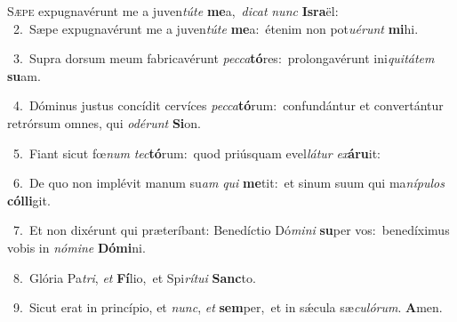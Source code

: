 \lettrine{\initial\textcolor{\initialcolor}{S}}{æpe} expugnavérunt me a juven\-\textit{tú}\-\textit{te} \textbf{me}\-a,~\star \textit{di}\-\textit{cat} \textit{nunc} \textbf{Is}\-\textbf{ra}ël:\\
{\numbfont\textcolor{\numbcolor}{~2.}}~Sæpe expugnavérunt me a juven\-\textit{tú}\-\textit{te} \textbf{me}\-a:~\star étenim non pot\-\textit{u}\-\textit{é}\textit{runt} \textbf{mi}\-hi.\par
{\numbfont\textcolor{\numbcolor}{~3.}}~Supra dorsum meum fabricavérunt \textit{pec}\-\textit{ca}\textbf{tó}res:~\star prolongavérunt ini\-\textit{qui}\-\textit{tá}\textit{tem} \textbf{su}\-am.\par
{\numbfont\textcolor{\numbcolor}{~4.}}~Dóminus justus concídit cervíces \textit{pec}\-\textit{ca}\textbf{tó}rum:~\star confundántur et convertántur retrórsum omnes, qui \textit{o}\-\textit{dé}\textit{runt} \textbf{Si}\-on.\par
{\numbfont\textcolor{\numbcolor}{~5.}}~Fiant sicut fœ\textit{num} \textit{tec}\-\textbf{tó}rum:~\star quod priúsquam evel\-\textit{lá}\-\textit{tur} \textit{ex}\-\textbf{á}\textbf{ru}it:\par
{\numbfont\textcolor{\numbcolor}{~6.}}~De quo non implévit manum su\textit{am} \textit{qui} \textbf{me}\-tit:~\star et sinum suum qui ma\-\textit{ní}\-\textit{pu}\textit{los} \textbf{cól}\-\textbf{li}git.\par
{\numbfont\textcolor{\numbcolor}{~7.}}~Et non dixérunt qui præteríbant: Benedíctio Dó\-\textit{mi}\-\textit{ni} \textbf{su}\-per vos:~\star benedíximus vobis in \textit{nó}\-\textit{mi}\textit{ne} \textbf{Dó}\-\textbf{mi}ni.\par
{\numbfont\textcolor{\numbcolor}{~8.}}~Glória Pa\-\textit{tri}\-, \textit{et} \textbf{Fí}\-lio,~\star et Spi\-\textit{rí}\-\textit{tu}\textit{i} \textbf{Sanc}\-to.\par
{\numbfont\textcolor{\numbcolor}{~9.}}~Sicut erat in princípio, et \textit{nunc}\-, \textit{et} \textbf{sem}\-per,~\star et in sǽcula sæ\-\textit{cu}\-\textit{ló}\textit{rum}. \textbf{A}\-men.\par
